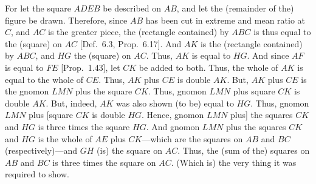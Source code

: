 \begin{Parallel}{}{}
{For let the square $ADEB$ be described on $AB$, and
let the (remainder of the) figure be drawn. Therefore, since
$AB$ has been cut in extreme and mean ratio at $C$,  and $AC$ is the greater piece, the (rectangle contained) by $ABC$ is thus equal to the
(square) on $AC$ [Def.~6.3, Prop.~6.17]. And $AK$ is the (rectangle
contained) by $ABC$, and $HG$ the (square) on $AC$. Thus,
$AK$ is equal to $HG$.  And since $AF$ is equal to $FE$ [Prop.~1.43],
let $CK$ be added to both. Thus, the whole of $AK$  is equal to
the whole of $CE$. Thus, $AK$ plus $CE$ is double $AK$. But, $AK$
plus $CE$ is the gnomon $LMN$ plus the square $CK$. Thus, 
gnomon $LMN$ plus square $CK$ is double $AK$. But, indeed,
$AK$ was also shown (to be) equal to $HG$. Thus, gnomon $LMN$
plus [square $CK$ is double $HG$. Hence, gnomon $LMN$ plus] the
 squares $CK$ and $HG$ is three times the square $HG$.
And  gnomon $LMN$ plus the  squares  $CK$ and
$HG$ is the whole of $AE$ plus $CK$---which are the 
squares on $AB$ and $BC$ (respectively)---and $GH$ (is) the square on $AC$. 
Thus, the (sum of the) squares on $AB$ and $BC$ is three times the
square on $AC$. (Which is) the very thing it was required to show.}
\end{Parallel}

